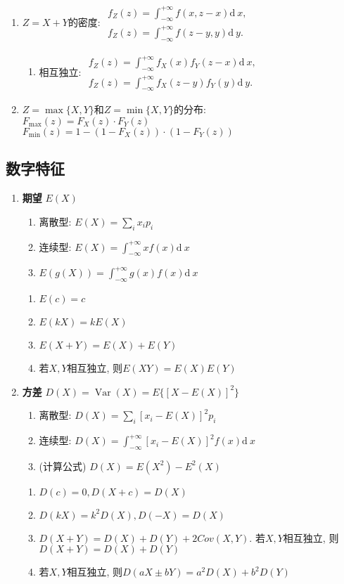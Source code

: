 \documentclass[10pt,a4paper,nofonts]{ctexart}
\renewcommand{\d}{{\mathrm{d}\:\!}}
\DeclareMathOperator{\Var}{Var}
\begin{document}
\begin{multicols}{2}
\begin{enumerate}
\item $Z=X+Y$的密度: $\begin{array}{l}
f_Z(z)=\int_{-\infty}^{+\infty}f(x,z-x)\d x,\\
f_Z(z)=\int_{-\infty}^{+\infty}f(z-y, y)\d y.
\end{array}$
\begin{enumerate}
\item 相互独立: $\begin{array}{l}
f_Z(z)=\int_{-\infty}^{+\infty}f_X(x)f_Y(z-x)\d x,\\
f_Z(z)=\int_{-\infty}^{+\infty}f_X(z-y)f_Y(y)\d y.
\end{array}$
\end{enumerate}
\item $Z=\max\{X,Y\}$和$Z=\min\{X,Y\}$的分布: \\
$F_{\max}(z)=F_X(z)\cdot F_Y(z)$\\
$F_{\min}(z)=1-(1-F_X(z))\cdot(1-F_Y(z))$
\end{enumerate}

\subsection{数字特征}

\begin{enumerate}

\item {\bf 期望} $E(X)$
\begin{enumerate}
\item 离散型: $E(X)=\sum_i x_i p_i$
\item 连续型: $E(X)=\int_{-\infty}^{+\infty}xf(x)\d x$
\item $E(g(X))=\int_{-\infty}^{+\infty}g(x)f(x)\d x$
\end{enumerate}
\begin{enumerate}[label={\sf 性质\arabic*}]
\item $E(c) = c$
\item $E(kX) = kE(X)$
\item $E(X+Y) = E(X)+E(Y)$
\item 若$X,Y$相互独立, 则$E(XY) = E(X)E(Y)$
\end{enumerate}

\item {\bf 方差} $D(X)=\Var(X)=E\{[X-E(X)]^2\}$
\begin{enumerate}
\item 离散型: $D(X)=\sum_i [x_i-E(X)]^2 p_i$
\item 连续型: $D(X)=\int_{-\infty}^{+\infty}[x_i-E(X)]^2 f(x)\d x$
\item (计算公式) $D(X)=E(X^2)-E^2(X)$
\end{enumerate}
\begin{enumerate}[label={\sf 性质\arabic*}]
\item $D(c) = 0, D(X+c)=D(X)$
\item $D(kX) = k^2 D(X), D(-X)=D(X)$
\item $D(X+Y) = D(X)+D(Y)+2Cov(X,Y)$. 若$X,Y$相互独立, 则$D(X+Y) = D(X)+D(Y)$
\item 若$X,Y$相互独立, 则$D(aX\pm bY)=a^2 D(X)+b^2 D(Y)$
\end{enumerate}


\end{enumerate}
\end{multicols}
\end{document}
